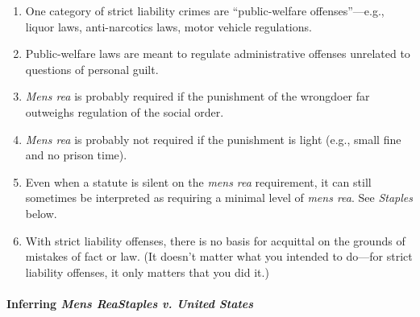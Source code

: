 \begin{enumerate}
    \item One category of strict liability crimes are ``public-welfare offenses''---e.g., liquor laws, anti-narcotics laws, motor vehicle regulations.
    \item Public-welfare laws are meant to regulate administrative offenses unrelated to questions of personal guilt.
    \item \emph{Mens rea} is probably required if the punishment of the wrongdoer far outweighs regulation of the social order.
    \item \emph{Mens rea} is probably not required if the punishment is light (e.g., small fine and no prison time).
    \item Even when a statute is silent on the \emph{mens rea} requirement, it can still sometimes be interpreted as requiring a minimal level of \emph{mens rea}. See \emph{Staples} below.
    \item With strict liability offenses, there is no basis for acquittal on the grounds of mistakes of fact or law. (It doesn't matter what you intended to do---for strict liability offenses, it only matters that you did it.)
\end{enumerate}

\paragraph{Inferring \emph{Mens Rea}\emph{Staples v. United States}}

